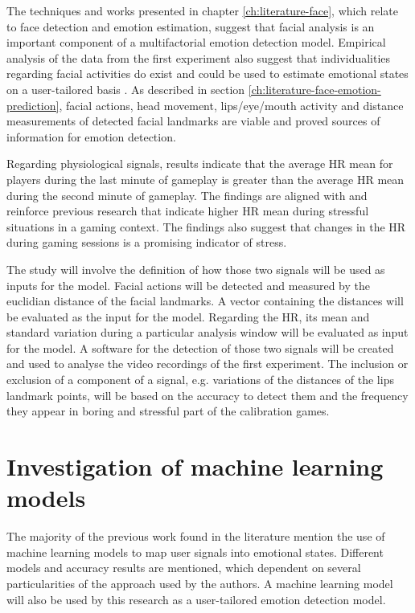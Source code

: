The techniques and works presented in chapter \ref{ch:literature-face}, which relate to face detection and emotion estimation, suggest that facial analysis is an important component of a multifactorial emotion detection model. Empirical analysis of the data from the first experiment also suggest that individualities regarding facial activities do exist and could be used to estimate emotional states on a user-tailored basis \parencite{bevilacqua2016variations}. As described in section \ref{ch:literature-face-emotion-prediction}, facial actions, head movement, lips/eye/mouth activity and distance measurements of detected facial landmarks are viable and proved sources of information for emotion detection.

Regarding physiological signals, results indicate that the average HR mean for players during the last minute of gameplay is greater than the average HR mean during the second minute of gameplay. The findings are aligned with and reinforce previous research that indicate higher HR mean during stressful situations in a gaming context. The findings also suggest that changes in the HR during gaming sessions is a promising indicator of stress.

The study will involve the definition of how those two signals will be used as inputs for the model. Facial actions will be detected and measured by the euclidian distance of the facial landmarks. A vector containing the distances will be evaluated as the input for the model. Regarding the HR, its mean and standard variation during a particular analysis window will be evaluated as input for the model. A software for the detection of those two signals will be created and used to analyse the video recordings of the first experiment. The inclusion or exclusion of a component of a signal, e.g. variations of the distances of the lips landmark points, will be based on the accuracy to detect them and the frequency they appear in boring and stressful part of the calibration games.

\section{Investigation of machine learning models}
\label{closing:investigation-machine-learning}

The majority of the previous work found in the literature mention the use of machine learning models to map user signals into emotional states. Different models and accuracy results are mentioned, which dependent on several particularities of the approach used by the authors. A machine learning model will also be used by this research as a user-tailored emotion detection model.

